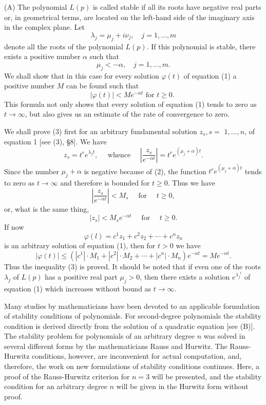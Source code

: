 \documentclass[10pt,a5paper]{book}
\theoremstyle{plain}
\theoremstyle{definition}
\theoremstyle{remark}
\begin{document}
(A) The polynomial $L(p)$ is called stable if all its roots have negative real parts or, in geometrical terms, are located on the left-hand side of the imaginary axis in the complex plane. Let
\[
\lambda_{j}=\mu_{j}+i \nu_{j}, \quad j=1, \ldots, m
\]
denote all the roots of the polynomial $L(p)$. If this polynomial is stable, there exists a positive number $\alpha$ such that
\begin{equation*}
\mu_{j}<-\alpha, \quad j=1, \ldots, m . \tag{2}
\end{equation*}
We shall show that in this case for every solution $\varphi(t)$ of equation (1) a positive number $M$ can be found such that
\begin{equation*}
|\varphi(t)|<M e^{-\alpha t} \text { for } t \geq 0 \text {. } \tag{3}
\end{equation*}
This formula not only shows that every solution of equation (1) tends to zero as $t \rightarrow \infty$, but also gives us an estimate of the rate of convergence to zero.

We shall prove (3) first for an arbitrary fundamental solution $z_{s}, s=$ $1, \ldots, n$, of equation 1 [see (3), §8]. We have
\[
z_{s}=t^{r} e^{\lambda_{j} t}, \quad \text { whence } \quad\left|\frac{z_{s}}{e^{-\alpha t}}\right|=t^{r} e^{\left(\mu_{j}+\alpha\right) t} .
\]
Since the number $\mu_{j}+\alpha$ is negative because of (2), the function $t^{r} e^{\left(\mu_{j}+\alpha\right) t}$ tends to zero as $t \rightarrow \infty$ and therefore is bounded for $t \geq 0$. Thus we have
\[
\left|\frac{z_{s}}{e^{-\alpha t}}\right|<M_{s} \quad \text { for } \quad t \geq 0,
\]
or, what is the same thing,
\[
\left|z_{s}\right|<M_{s} e^{-\alpha t} \quad \text { for } \quad t \geq 0 .
\]
If now
\[
\varphi(l)=c^{1} z_{1}+c^{2} z_{2}+\cdots+c^{n} z_{n}
\]
is an arbitrary solution of equation (1), then for $t>0$ we have
\[
|\varphi(t)| \leq\left(\left|c^{1}\right| \cdot M_{1}+\left|c^{2}\right| \cdot M_{2}+\cdots+\left|c^{n}\right| \cdot M_{n}\right) e^{-\alpha t}=M e^{-\alpha t} .
\]
Thus the inequality (3) is proved. It should be noted that if even one of the roots $\lambda_{j}$ of $L(p)$ has a positive real part $\mu_{j}>0$, then there exists a solution $e^{\lambda_{j}{ }^{t}}$ of equation (1) which increases without bound as $t \rightarrow \infty$.

Many studies by mathematicians have been devoted to an applicable formulation of stability conditions of polynomials. For second-degree polynomials the stability condition is derived directly from the solution of a quadratic equation [see (B)]. The stability problem for polynomials of an arbitrary degree $n$ was solved in several different forms by the mathematicians Rauss and Hurwitz. The Rauss-Hurwitz conditions, however, are inconvenient for actual computation, and, therefore, the work on new formulations of stability conditions continues. Here, a proof of the Rauss-Hurwitz criterion for $n=3$ will be presented, and the stability condition for an arbitrary degree $n$ will be given in the Hurwitz form without proof.
\end{document}
